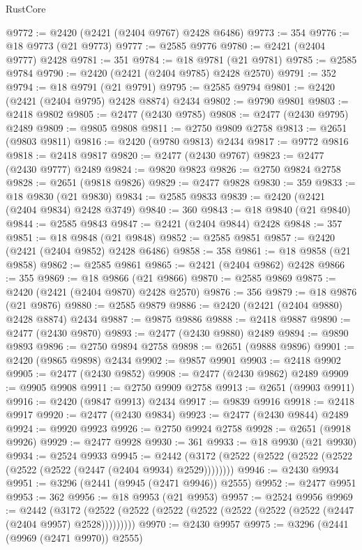 \begin{lexlean}{RustCore}
\begin{coremodule}
@9772 := @2420 (@2421 (@2404 @9767) @2428 @6486)
@9773 := 354
@9776 := @18 @9773 (@21 @9773)
@9777 := @2585 @9776
@9780 := @2421 (@2404 @9777) @2428
@9781 := 351
@9784 := @18 @9781 (@21 @9781)
@9785 := @2585 @9784
@9790 := @2420 (@2421 (@2404 @9785) @2428 @2570)
@9791 := 352
@9794 := @18 @9791 (@21 @9791)
@9795 := @2585 @9794
@9801 := @2420 (@2421 (@2404 @9795) @2428 @8874) @2434
@9802 := @9790 @9801
@9803 := @2418 @9802
@9805 := @2477 (@2430 @9785)
@9808 := @2477 (@2430 @9795) @2489
@9809 := @9805 @9808
@9811 := @2750 @9809 @2758
@9813 := @2651 (@9803 @9811)
@9816 := @2420 (@9780 @9813) @2434
@9817 := @9772 @9816
@9818 := @2418 @9817
@9820 := @2477 (@2430 @9767)
@9823 := @2477 (@2430 @9777) @2489
@9824 := @9820 @9823
@9826 := @2750 @9824 @2758
@9828 := @2651 (@9818 @9826)
@9829 := @2477 @9828
@9830 := 359
@9833 := @18 @9830 (@21 @9830)
@9834 := @2585 @9833
@9839 := @2420 (@2421 (@2404 @9834) @2428 @3749)
@9840 := 360
@9843 := @18 @9840 (@21 @9840)
@9844 := @2585 @9843
@9847 := @2421 (@2404 @9844) @2428
@9848 := 357
@9851 := @18 @9848 (@21 @9848)
@9852 := @2585 @9851
@9857 := @2420 (@2421 (@2404 @9852) @2428 @6486)
@9858 := 358
@9861 := @18 @9858 (@21 @9858)
@9862 := @2585 @9861
@9865 := @2421 (@2404 @9862) @2428
@9866 := 355
@9869 := @18 @9866 (@21 @9866)
@9870 := @2585 @9869
@9875 := @2420 (@2421 (@2404 @9870) @2428 @2570)
@9876 := 356
@9879 := @18 @9876 (@21 @9876)
@9880 := @2585 @9879
@9886 := @2420 (@2421 (@2404 @9880) @2428 @8874) @2434
@9887 := @9875 @9886
@9888 := @2418 @9887
@9890 := @2477 (@2430 @9870)
@9893 := @2477 (@2430 @9880) @2489
@9894 := @9890 @9893
@9896 := @2750 @9894 @2758
@9898 := @2651 (@9888 @9896)
@9901 := @2420 (@9865 @9898) @2434
@9902 := @9857 @9901
@9903 := @2418 @9902
@9905 := @2477 (@2430 @9852)
@9908 := @2477 (@2430 @9862) @2489
@9909 := @9905 @9908
@9911 := @2750 @9909 @2758
@9913 := @2651 (@9903 @9911)
@9916 := @2420 (@9847 @9913) @2434
@9917 := @9839 @9916
@9918 := @2418 @9917
@9920 := @2477 (@2430 @9834)
@9923 := @2477 (@2430 @9844) @2489
@9924 := @9920 @9923
@9926 := @2750 @9924 @2758
@9928 := @2651 (@9918 @9926)
@9929 := @2477 @9928
@9930 := 361
@9933 := @18 @9930 (@21 @9930)
@9934 := @2524 @9933
@9945 := @2442 (@3172 (@2522 (@2522 (@2522 (@2522 (@2522 (@2522 (@2447 (@2404 @9934) @2529))))))))
@9946 := @2430 @9934
@9951 := @3296 (@2441 (@9945 (@2471 @9946)) @2555)
@9952 := @2477 @9951
@9953 := 362
@9956 := @18 @9953 (@21 @9953)
@9957 := @2524 @9956
@9969 := @2442
    (@3172 (@2522 (@2522 (@2522 (@2522 (@2522 (@2522 (@2522 (@2447 (@2404 @9957) @2528)))))))))
@9970 := @2430 @9957
@9975 := @3296 (@2441 (@9969 (@2471 @9970)) @2555)

\end{coremodule}
\end{lexlean}
